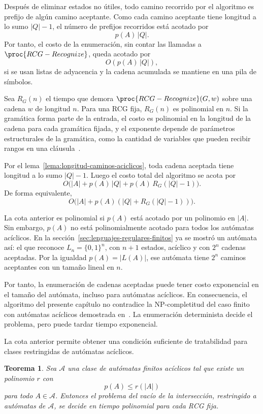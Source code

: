 \documentclass{report}
\theoremstyle{definition}
\theoremstyle{plain}
\newtheorem{teorema}{Teorema}[chapter]
\theoremstyle{remark}
\begin{document}
Después de eliminar estados no útiles, todo camino recorrido por el
algoritmo es prefijo de algún camino aceptante. Como cada camino
aceptante tiene longitud a lo sumo $|Q|-1$, el número de prefijos
recorridos está acotado por
\[
  p(A)\,|Q|.
\]
Por tanto, el costo de la enumeración, sin contar las llamadas a
$\proc{RCG-Recognize}$, queda acotado por
\[
  O(p(A)\,|Q|),
\]
si se usan listas de adyacencia y la cadena acumulada se mantiene en
una pila de símbolos.

Sea $R_G(n)$ el tiempo que demora
$\proc{RCG-Recognize}(G,w)$ sobre una cadena $w$ de longitud $n$. Para
una RCG fija, $R_G(n)$ es polinomial en $n$. Si la gramática forma parte
de la entrada, el costo es polinomial en la longitud de la cadena para
cada gramática fijada, y el exponente depende de parámetros
estructurales de la gramática, como la cantidad de variables que pueden
recibir rangos en una cláusula~\cite{bertsch2001rcg,kallmeyer2010parsing}.

Por el lema~\ref{lema:longitud-caminos-aciclicos}, toda cadena aceptada
tiene longitud a lo sumo $|Q|-1$. Luego el costo total del algoritmo se
acota por
\[
  O\bigl( |A| + p(A)\,|Q| + p(A)\,R_G(|Q|-1) \bigr).
\]
De forma equivalente,
\[
  O\bigl( |A| + p(A)(|Q| + R_G(|Q|-1)) \bigr).
\]

La cota anterior es polinomial si $p(A)$ está acotado por un polinomio
en $|A|$. Sin embargo, $p(A)$ no está polinomialmente acotado para todos
los autómatas acíclicos. En la
sección~\ref{sec:lenguajes-regulares-finitos} ya se mostró un
autómata así: el que reconoce $L_n=\{0,1\}^n$, con $n+1$ estados,
acíclico y con $2^n$ cadenas aceptadas. Por la igualdad $p(A)=|L(A)|$,
ese autómata tiene $2^n$ caminos aceptantes con un tamaño lineal en $n$.

Por tanto, la enumeración de cadenas aceptadas puede tener
costo exponencial en el tamaño del autómata, incluso para autómatas
acíclicos. En consecuencia, el algoritmo del presente
capítulo no contradice la NP-completitud del caso finito con autómatas
acíclicos demostrada en~\cite{bertsch2001rcg}. La enumeración
determinista decide el problema, pero puede tardar tiempo exponencial.

La cota anterior permite obtener una condición suficiente de
tratabilidad para clases restringidas de autómatas acíclicos.

\begin{teorema}
\label{teo:clases-pol-caminos}
Sea $\mathcal{A}$ una clase de autómatas finitos acíclicos tal que
existe un polinomio $r$ con
\[
  p(A) \le r(|A|)
\]
para todo $A \in \mathcal{A}$. Entonces el problema del vacío de la
intersección, restringido a autómatas de $\mathcal{A}$, se decide en
tiempo polinomial para cada RCG fija.
\end{teorema}
\end{document}
